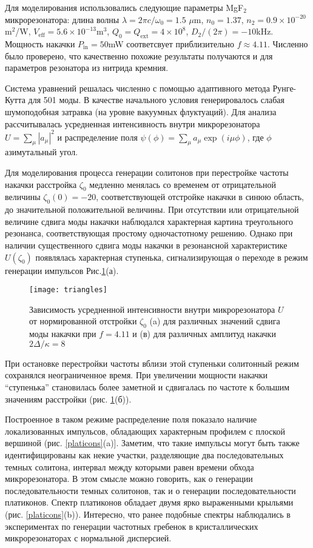 Для моделирования использовались следующие параметры MgF$_2$ микрорезонатора: длина волны $\lambda=2\pi c/\omega_0=1.5$ $\mu$m, $n_0=1.37$, $n_2=0.9\times 10^{-20}$ m$^2$/W, $V_{\mathrm{eff}}=5.6\times 10^{-13}$m$^3$,  $Q_0=Q_\text{ext}=4\times 10^8$, $D_2/(2\pi)=-10$kHz. Мощность накачки $P_\mathrm{in}=50$mW соответсвует приблизительно $f\approx 4.11$. Численно было проверено, что качественно похожие результаты получаются и для параметров резонатора из нитрида кремния\cite{Brasch2016}.

Система уравнений решалась численно с помощью адаптивного метода Рунге-Кутта для 501 моды. В качестве начального условия генерировалось слабая шумоподобная затравка (на уровне вакуумных флуктуаций). Для анализа рассчитывалась усредненная интенсивность внутри микрорезонатора $U=\sum_\mu |a_\mu|^2$ и распределение поля $\psi(\phi)=\sum_\mu a_\mu \exp(i\mu\phi)$, где $\phi$ азимутальный угол.

Для моделирования процесса генерации солитонов при перестройке частоты накачки расстройка $\zeta_0$ медленно менялась со временем от отрицательной величины $\zeta_0(0)=-20$, соответствующей отстройке накачки в синюю область, до значительной положительной величины.  При отсутствии или отрицательной величине сдвига моды накачки наблюдался характерная картина треугольного резонанса, соответствующая простому одночастотному решению. Однако при наличии существенного сдвига моды накачки в резонансной характеристике $U(\zeta_0)$ появлялась характерная ступенька, сигнализирующая о переходе в режим генерации импульсов Рис.\ref{platicon_triangles}(а).

\begin{figure}
  \centering
  \texttt{[image: triangles]}
  \caption{Зависимость усредненной интенсивности внутри микрорезонатора $U$ от нормированной отстройки $\zeta_0$ (a) для различных значений сдвига моды накачки при $f=4.11$ и (в) для различных амплитуд накачки $2\Delta/\kappa=8$} \label{platicon_triangles}
\end{figure}


При остановке перестройки частоты вблизи этой ступеньки солитонный режим сохранялся неограниченное время.
При увеличении мощности накачки “ступенька” становилась более заметной и сдвигалась по частоте к большим значениям расстройки (рис. \ref{platicon_triangles}(б)).

Построенное в таком режиме распределение поля показало наличие локализованных импульсов, обладающих характерным профилем с плоской вершиной (рис. \ref{platicons}(a)]. Заметим, что такие импульсы могут быть также идентифицированы как некие участки, разделяющие два последовательных темных солитона, интервал между которыми равен времени обхода микрорезонатора. В этом смысле можно говорить, как о генерации последовательности темных солитонов, так и о генерации последовательности платиконов. Спектр платиконов обладает двумя ярко выраженными крыльями (рис. \ref{platicons}(b)). Интересно, что ранее подобные спектры наблюдались в экспериментах по генерации частотных гребенок в кристаллических микрорезонаторах с нормальной дисперсией.


